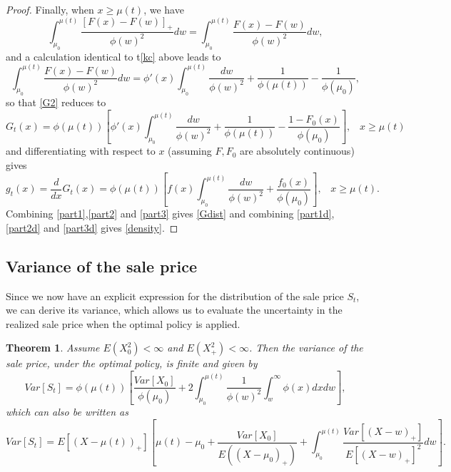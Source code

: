 \documentclass{article}
\newtheorem{thm}{Theorem}[section]
\numberwithin{equation}{section}
\begin{document}
\begin{proof}
	Finally, when $x\geq \mu(t)$, we have
	$$\int_{\mu_0}^{\mu(t)} \frac{[F(x)-F(w)]_+}{\phi(w)^2}  dw=\int_{\mu_0}^{\mu(t)} \frac{F(x)-F(w)}{\phi(w)^2} dw,$$
	and a calculation identical to t\eqref{kc} above leads to 
	$$\int_{\mu_0}^{\mu(t)} \frac{F(x)-F(w)}{\phi(w)^2} dw=\phi'(x)\int_{\mu_0}^{\mu(t)}\frac{dw}{\phi(w)^2} +\frac{1}{\phi(\mu(t))}-\frac{1}{\phi(\mu_0)},$$
	so that \eqref{G2} reduces to
	\begin{equation}\label{part3}G_t(x)=\phi(\mu(t))\left[\phi'(x)\int_{\mu_0}^{\mu(t)}\frac{dw}{\phi(w)^2}+\frac{1}{\phi(\mu(t))}-\frac{1-F_0(x)}{\phi(\mu_0)}\right],\;\;\; x\geq \mu(t)\end{equation}
	and differentiating with respect to $x$
	(assuming $F,F_0$ are absolutely continuous) gives 
	\begin{equation}\label{part3d}g_t(x)=\frac{d}{dx}G_t(x)=\phi(\mu(t))\left[f(x)\int_{\mu_0}^{\mu(t)}\frac{dw}{\phi(w)^2}+\frac{f_0(x)}{\phi(\mu_0)}\right],\;\;\;x\geq\mu(t).\end{equation}
	Combining \eqref{part1},\eqref{part2} and \eqref{part3} gives \eqref{Gdist} and combining 
	\eqref{part1d},\eqref{part2d} and \eqref{part3d}
	gives \eqref{density}. 
\end{proof}


\subsection{Variance of the sale price}
\label{var_V}

Since we now have 
an explicit expression for the distribution of the sale price $S_t$, we can derive its variance, which allows us to evaluate the uncertainty in the realized sale price when the optimal policy is applied.

\begin{thm}
	Assume $E(X_0^2)<\infty$ and $E(X_+^2)<\infty$.
	Then the variance of the sale price, under the optimal policy, is finite and given by
	\begin{equation}\label{varf}
		Var[S_t]=\phi(\mu(t)) \left[\frac{Var[X_0]}{\phi(\mu_0)} +2
		\int_{\mu_0}^{\mu(t)}\frac{1}{\phi(w)^2} \int_{w}^\infty \phi(x) dx dw\right], \end{equation}
	which can also be written as
	\begin{equation}\label{varfv}
		Var[S_t]=E[(X-\mu(t))_+] \left[\mu(t)-\mu_0 +\frac{Var[X_0]}{E((X-\mu_0)_+)}+
		\int_{\mu_0}^{\mu(t)}\frac{Var[(X-w)_+]}{E[(X-w)_+]^2}  dw\right].
	\end{equation}
\end{thm}
\end{document}
